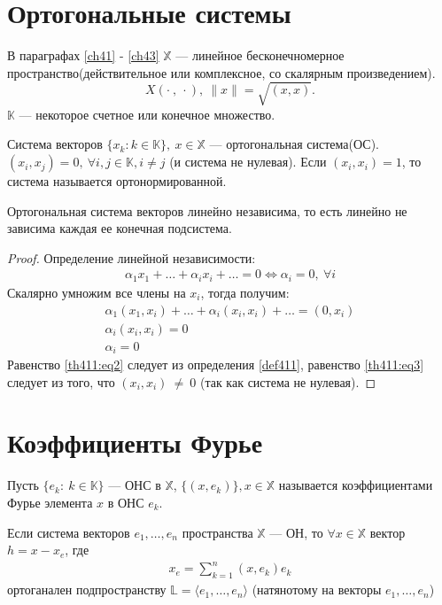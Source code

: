 \section{Ортогональные системы} \label{ch41}
В параграфах \eqref{ch41} - \eqref{ch43} $\mathbb{X}$ --- линейное
бесконечномерное пространство(действительное или комплексное, со скалярным
произведением).
$$X(\cdot \ , \ \cdot), \ \|x\| = \sqrt{(x, x)}.$$
$\mathbb{K}$ --- некоторое счетное или конечное множество.
\begin{definition}
  \label{def411}
  Система векторов $\{x_k: k \in \mathbb{K}\}, \ x \in \mathbb{X}$ ---
  ортогональная система(ОС). \\
  $(x_i, x_j) = 0, \ \forall i, j \in \mathbb{K}, i \not = j$ (и система не
  нулевая). Если $(x_i, x_i) = 1$, то система называется ортонормированной.
\end{definition}

\begin{theorem}
  Ортогональная система векторов линейно независима, то есть линейно не
  зависима каждая ее конечная подсистема.
\end{theorem}
\begin{proof}
  Определение линейной независимости:
  \begin{gather*}
    \alpha_1 x_1 + \dots + \alpha_i x_i +
    \dots = 0 \Longleftrightarrow \alpha_i = 0, \ \forall i
  \end{gather*}
  Скалярно умножим все члены на $x_i$, тогда получим:
  \begin{gather*}
    \label{th411:eq1}
    \alpha_1 (x_1, x_i) + \dots + \alpha_i (x_i, x_i) + \dots = (0, x_i) \\
    \label{th411:eq2}
    \alpha_i (x_i, x_i) = 0 \\
    \label{th411:eq3}
    \alpha_i = 0
  \end{gather*}
  Равенство \eqref{th411:eq2} следует из определения \eqref{def411}, равенство
  \eqref{th411:eq3} следует из того, что $(x_i, x_i)~\not=~0$ (так как система
  не нулевая).
\end{proof}

\section{Коэффициенты Фурье}
\begin{definition}
  Пусть $\{e_k: \ k \in \mathbb{K}\}$ --- ОНС в $\mathbb{X}$, $\{(x, e_k)\}, x
  \in \mathbb{X}$ называется коэффициентами Фурье элемента $x$ в ОНС $e_k$.
\end{definition}
\begin{lemma}
  \label{lemma421}
  Если система векторов $e_1, \dots, e_n$ пространства $\mathbb{X}$ --- ОН, то
  $\forall x \in \mathbb{X}$ вектор $h = x - x_e$, где
  \begin{gather}
    x_e = \sum\limits_{k = 1}^{n} (x, e_k) e_k
    \label{lemma1:eq1}
  \end{gather}
  ортоганален подпространству $\mathbb{L} = \langle e_1, \dots, e_n \rangle$ (натянотому
  на векторы $e_1, \dots, e_n$)
\end{lemma}

